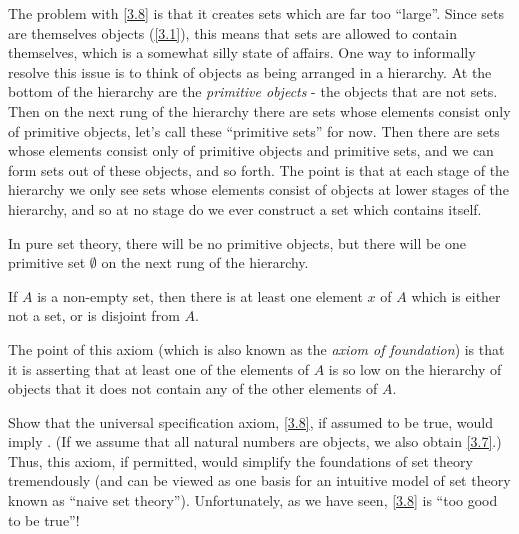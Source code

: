 \begin{note}
  The problem with \cref{3.8} is that it creates sets which are far too ``large''.
  Since sets are themselves objects (\cref{3.1}), this means that sets are allowed to contain themselves, which is a somewhat silly state of affairs.
  One way to informally resolve this issue is to think of objects as being arranged in a hierarchy.
  At the bottom of the hierarchy are the \emph{primitive objects} - the objects that are not sets.
  Then on the next rung of the hierarchy there are sets whose elements consist only of primitive objects, let's call these ``primitive sets'' for now.
  Then there are sets whose elements consist only of primitive objects and primitive sets, and we can form sets out of these objects, and so forth.
  The point is that at each stage of the hierarchy we only see sets whose elements consist of objects at lower stages of the hierarchy, and so at no stage do we ever construct a set which contains itself.
\end{note}

\begin{note}
  In pure set theory, there will be no primitive objects, but there will be one primitive set \(\emptyset\) on the next rung of the hierarchy.
\end{note}

\begin{axiom}[Regularity]\label{3.9}
  If \(A\) is a non-empty set, then there is at least one element \(x\) of \(A\) which is either not a set, or is disjoint from \(A\).
\end{axiom}

\begin{note}
  The point of this axiom (which is also known as the \emph{axiom of foundation}) is that it is asserting that at least one of the elements of \(A\) is so low on the hierarchy of objects that it does not contain any of the other elements of \(A\).
\end{note}

\exercisesection

\begin{exercise}\label{ex 3.2.1}
  Show that the universal specification axiom, \cref{3.8}, if assumed to be true, would imply .
  (If we assume that all natural numbers are objects, we also obtain \cref{3.7}.)
  Thus, this axiom, if permitted, would simplify the foundations of set theory tremendously (and can be viewed as one basis for an intuitive model of set theory known as ``naive set theory'').
  Unfortunately, as we have seen, \cref{3.8} is ``too good to be true''!
\end{exercise}


